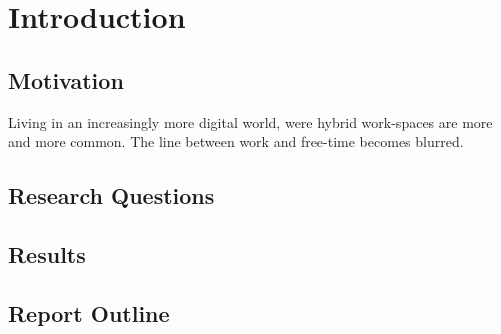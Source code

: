 \chapter{Introduction}

\section{Motivation}

Living in an increasingly more digital world, were hybrid work-spaces are more and more common. The line between work and free-time becomes blurred. 

\section{Research Questions}

\section{Results}

\section{Report Outline}
